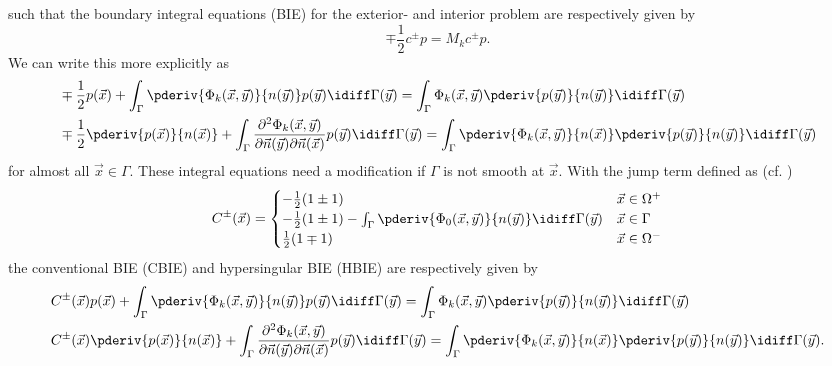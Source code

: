 such that the boundary integral equations (BIE) for the exterior- and interior problem are respectively given by
\begin{equation*}
	\mp\frac{1}{2}c^\pm p = M_k c^\pm p.
\end{equation*}
We can write this more explicitly as
\begin{align*}
	&\mp \frac{1}{2}p(\vec{x}) + \int_\Gamma \pderiv{\Phi_k(\vec{x},\vec{y})}{n(\vec{y})} p(\vec{y}) \idiff\Gamma(\vec{y}) = \int_\Gamma \Phi_k(\vec{x},\vec{y}) \pderiv{p(\vec{y})}{n(\vec{y})} \idiff\Gamma(\vec{y})\\
	&\mp \frac{1}{2}\pderiv{p(\vec{x})}{n(\vec{x})} +  \int_\Gamma \frac{\partial^2\Phi_k(\vec{x},\vec{y})}{\partial\vec{n}(\vec{y})\partial\vec{n}(\vec{x})} p(\vec{y}) \idiff\Gamma(\vec{y}) = \int_\Gamma \pderiv{\Phi_k(\vec{x},\vec{y})}{n(\vec{x})} \pderiv{p(\vec{y})}{n(\vec{y})} \idiff\Gamma(\vec{y})
\end{align*}
for almost all $\vec{x}\in\Gamma$. These integral equations need a modification if $\Gamma$ is not smooth at $\vec{x}$. With the jump term defined as (cf. \cite{Hwang1997hbi})
\begin{equation}\label{Eq3:jumpTerm}
	C^\pm(\vec{x}) = \begin{cases}-\frac{1}{2}(1\pm 1) & \vec{x}\in\Omega^+\\-\frac{1}{2}(1\pm 1) - \int_\Gamma \pderiv{\Phi_0(\vec{x},\vec{y})}{n(\vec{y})}\idiff\Gamma(\vec{y}) &\vec{x}\in\Gamma\\
	\frac{1}{2}(1\mp 1)& \vec{x}\in\Omega^-\end{cases}
\end{equation}
the conventional BIE (CBIE) and hypersingular BIE (HBIE) are respectively given by 
\begin{align}\label{Eq3:CBIE}
	& C^\pm(\vec{x})p(\vec{x}) + \int_\Gamma \pderiv{\Phi_k(\vec{x},\vec{y})}{n(\vec{y})} p(\vec{y}) \idiff\Gamma(\vec{y}) = \int_\Gamma \Phi_k(\vec{x},\vec{y}) \pderiv{p(\vec{y})}{n(\vec{y})} \idiff\Gamma(\vec{y})\\\label{Eq3:HBIE}
	& C^\pm(\vec{x})\pderiv{p(\vec{x})}{n(\vec{x})} +  \int_\Gamma \frac{\partial^2\Phi_k(\vec{x},\vec{y})}{\partial\vec{n}(\vec{y})\partial\vec{n}(\vec{x})} p(\vec{y}) \idiff\Gamma(\vec{y}) = \int_\Gamma \pderiv{\Phi_k(\vec{x},\vec{y})}{n(\vec{x})} \pderiv{p(\vec{y})}{n(\vec{y})} \idiff\Gamma(\vec{y}).
\end{align}
